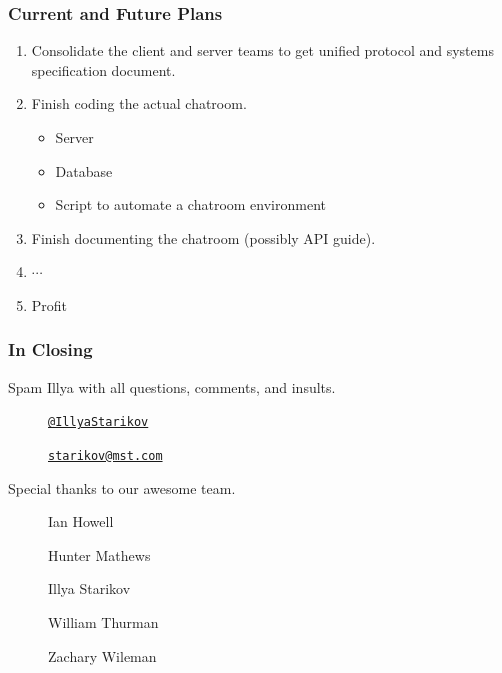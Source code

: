 \documentclass{beamer}
\begin{document}
\begin{frame}
    \frametitle{Current and Future Plans}

    \begin{enumerate}
        \item Consolidate the client and server teams to get unified protocol and systems specification document.
        \item Finish coding the actual chatroom.
        \begin{itemize}
            \item Server
            \item Database
            \item Script to automate a chatroom environment
        \end{itemize}

        \item Finish documenting the chatroom (possibly API guide).

        \pause
        \item $\cdots$
        \item Profit
    \end{enumerate}
\end{frame}


\begin{frame}
    \frametitle{In Closing}

    Spam Illya with all questions, comments, and insults.
    \begin{description}
        \item[\faGithub]  \href{https://github.com/IllyaStarikov}{\nolinkurl{@IllyaStarikov}}
        \item[\faComment] \href{mailto:starikov@mst.edu}{\nolinkurl{starikov@mst.com}}
    \end{description}

    Special thanks to our awesome team.
    \begin{description}
        \item[\faUser] Ian Howell
        \item[\faUser] Hunter Mathews
        \item[\faUser] Illya Starikov
        \item[\faUser] William Thurman
        \item[\faUser] Zachary Wileman
    \end{description}
\end{frame}
\end{document}
